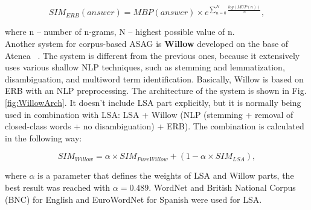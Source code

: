 \documentclass[11pt]{report}
\numberwithin{equation}{section} %
\begin{document}
\begin{equation} \label{eq:ERB}
SIM_{ERB}(answer) = MBP(answer)\times e^{\sum^{N}_{n=0}\frac{log(MUP(n))}{N}},
\end{equation}

where n -- number of n-grams, N -- highest possible value of n. \\

Another system for corpus-based ASAG is \textbf{Willow} developed on the base of Atenea ~\cite{Willow}. The system is different from the previous ones, because it extensively uses various shallow NLP techniques, such as stemming and lemmatization, disambiguation, and multiword term identification. Basically, Willow is based on ERB with an NLP preprocessing. The architecture of the system is shown in Fig. \ref{fig:WillowArch}. It doesn't include LSA part explicitly, but it is normally being used in combination with LSA: LSA + Willow (NLP (stemming + removal of closed-class words + no disambiguation) + ERB). The combination is calculated in the following way:

\begin{equation} \label{eq:Willow}
SIM_{Willow} = \alpha \times SIM_{PureWillow} + (1 - \alpha \times SIM_{LSA}),
\end{equation}

where $\alpha$ is a parameter that defines the weights of LSA and Willow parts, the best result was reached with $\alpha = 0.489$. WordNet and British National Corpus (BNC) for English and EuroWordNet for Spanish were used for LSA.\\
\end{document}
